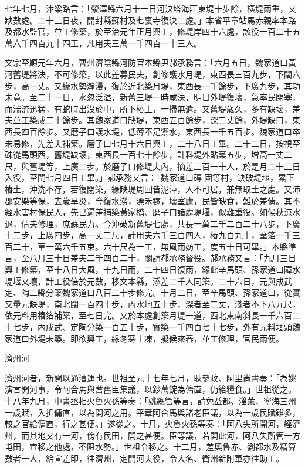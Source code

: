 \begin{pinyinscope}
 七年七月，汴梁路言：「滎澤縣六月十一日河決塔海莊東堤十步餘，橫堤兩重，又缺數處。二十三日夜，開封縣蘇村及七裏寺復決二處。」本省平章站馬赤親率本路及都水監官，並工修築，於至治元年正月興工，修堤岸四十六處，該役一百二十五萬六千四百九十四工，凡用夫三萬一千四百一十三人。



 文宗至順元年六月，曹州濟陰縣河防官本縣尹郝承務言：「六月五日，魏家道口黃河舊堤將決，不可修築，以此差募民夫，創修護水月堤，東西長三百九步，下闊六步，高一丈。又緣水勢瀚漫，復於近北築月堤，東西長一千餘步，下廣九步，其功未竟。至二十一日，水忽泛溢，新舊三堤一時咸決，明日外堤復壞，急率民閉塞，而湍流迅猛，有蛇時出沒於中，所下樁土，一掃無遺。又舊堤歲久，多有缺壞，差夫並工築成二十餘步。其魏家道口缺堤，東西五百餘步，深二丈餘，外堤缺口，東西長四百餘步。又磨子口護水堤，低薄不足禦水，東西長一千五百步。魏家道口卒未易修，先差夫補築。磨子口七月十六日興工，二十八日工畢。二十二日，按視至硃從馬頭西，舊堤缺壞，東西長一百七十餘步，計料堤外貼築五步，增高一丈二尺，與舊堤等，上廣二步。於磨子口修堤夫內，摘差三百一十人，於是月二十三日入役，至閏七月四日工畢。」郝承務又言：「魏家道口磚固等村，缺破堤堰，累下樁土，沖洗不存，若復閉築，緣缺堤周回皆泥淖，人不可居，兼無取土之處。又沛郡安樂等保，去歲旱災，今復水澇，漂禾稼，壞室廬，民皆缺食，難於差倩。其不經水害村保民人，先已遍差補築黃家橋、磨子口諸處堤堰，似難重役。如候秋涼水退，倩夫修理，庶蘇民力。今沖破新舊堤七處，共長一萬二千二百二十八步，下廣十二步，上廣四步，高一丈二尺，計用夫六千三百四人，樁九百九十，葦箔一千三百二十，草一萬六千五束。六十尺為一工，無風雨妨工，度五十日可畢。」本縣準言，至八月三十日差夫二千四百二十，關請郝承務督役。郝承務又言：「九月三日興工修築，至十八日大風，十九日雨，二十四日復雨，緣此辛馬頭、孫家道口障水堤堰又壞，計工役倍於元數，移文本縣，添差二千人同築。二十六日，元與成武定、陶二縣分築魏家道口八百二十步修完。十月二日，至辛馬頭、孫家道口，從實又量元缺堤，南北闊一百四十步，內水地五十步，深者至二丈，淺者不下八九尺，依元料用樁箔補築，至七日完。又於本處創築月堤一道，西北東南斜長一千六百二十七步，內成武、定陶分築一百五十步，實築一千四百七十七步，外有元料堌頭魏家道口外堤未築。即欲興工，緣冬寒土凍，擬候來春，並工修理，官民兩便。



 濟州河



 濟州河者，新開以通漕運也。世祖至元十七年七月，耿參政、阿里尚書奏：「為姚演言開河事，令阿合馬與耆舊臣集議，以鈔萬錠為傭直，仍給糧食。」世祖從之。十八年九月，中書丞相火魯火孫等奏：「姚總管等言，請免益都、淄萊、寧海三州一歲賦，入折傭直，以為開河之用。平章阿合馬與諸老臣議，以為一歲民賦雖多，較之官給傭直，行之甚便。」遂從之。十月，火魯火孫等奏：「阿八失所開河，經濟州，而其地又有一河，傍有民田，開之甚便。臣等議，若開此河，阿八失所管一方屯田，宜移之他處，不阻水勢。」世祖令移之。十二月，差奧魯赤、劉都水及精算數者一人，給宣差印，往濟州，定開河夫役，令大名、衛州新附軍亦往助工。




\end{pinyinscope}
